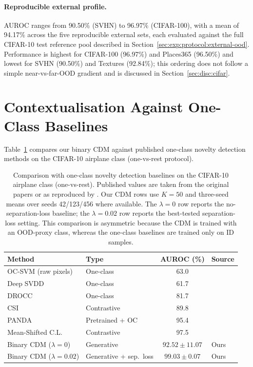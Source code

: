 \paragraph{Reproducible external profile.}
AUROC ranges from 90.50\% (SVHN) to 96.97\% (CIFAR-100), with a mean of
94.17\% across the five reproducible external sets, each evaluated against
the full CIFAR-10 test reference pool described in
Section~\ref{sec:exp:protocol:external-ood}.
Performance is highest for CIFAR-100 (96.97\%) and Places365 (96.50\%)
and lowest for SVHN (90.50\%) and Textures (92.84\%); this ordering does
not follow a simple near-vs-far-OOD gradient and is discussed in
Section~\ref{sec:disc:cifar}.


\section{Contextualisation Against One-Class Baselines}
\label{sec:results:baselines}

Table~\ref{tab:results:baselines} compares our binary CDM against
published one-class novelty detection methods on the CIFAR-10 airplane
class (one-vs-rest protocol).

\begin{table}[htbp]
  \centering
  \caption{Comparison with one-class novelty detection baselines on the
    CIFAR-10 airplane class (one-vs-rest). Published values are taken
    from the original papers or as reproduced by
    \cite{reiss2021panda}. Our CDM rows use $K{=}50$ and three-seed
    means over seeds 42/123/456 where available. The $\lambda{=}0$ row
    reports the no-separation-loss baseline; the $\lambda{=}0.02$ row
    reports the best-tested separation-loss setting. This comparison is
    asymmetric because the CDM is trained with an OOD-proxy class, whereas
    the one-class baselines are trained only on ID samples.}
  \label{tab:results:baselines}
  \begin{tabular}{llcl}
    \toprule
    Method & Type & AUROC (\%) & Source \\
    \midrule
    OC-SVM (raw pixels)   & One-class    & 63.0
      & \cite{ruff2018deep} \\
    Deep SVDD             & One-class    & 61.7
      & \cite{ruff2018deep} \\
    DROCC                 & One-class    & 81.7
      & \cite{goyal2020drocc} \\
    CSI                   & Contrastive  & 89.8
      & \cite{tack2020csi} \\
    PANDA                 & Pretrained + OC & 95.4
      & \cite{reiss2021panda} \\
    Mean-Shifted C.L.     & Contrastive  & 97.5
      & \cite{reiss2023meanshifted} \\
    \midrule
    Binary CDM ($\lambda{=}0$)   & Generative & $92.52 \pm 11.07$  & Ours \\
    Binary CDM ($\lambda{=}0.02$) & Generative + sep.\ loss & $99.03 \pm 0.07$ & Ours \\
    \bottomrule
  \end{tabular}
\end{table}

